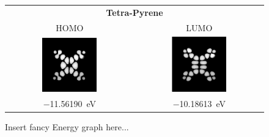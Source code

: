 
	\graphicspath{{./images/molecules/orbitals/tetra-pyrene/}}
	\begin{figure}[]
		\begin{minipage}{0.2\textwidth} \centering
		\end{minipage}
		\hfill
		\begin{minipage}{0.4\textwidth} \centering 
			\begin{tabular}{c|c}
				\multicolumn{2}{c}{\textbf{Tetra-Pyrene}} \\
				HOMO & LUMO \\
				\includegraphics[width=0.45\textwidth]{homo} &
				\includegraphics[width=0.45\textwidth]{lumo} \\
				\SI{-11.56190}{\electronvolt} & \SI{-10.18613}{\electronvolt} \\
			\end{tabular}
		\end{minipage}
		\hfill
		\begin{minipage}{0.2\textwidth} \centering
			Insert fancy Energy graph here...	
		\end{minipage}
	\end{figure}

